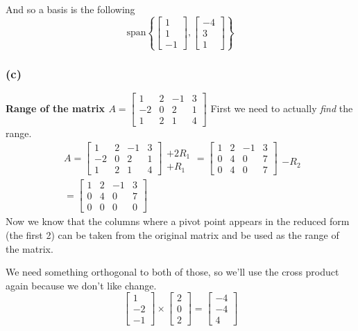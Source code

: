 \documentclass[10pt,letterpaper]{article}
\begin{document}
		And so a basis is the following
		$$
		\boxed{\text{span} \left\lbrace \begin{bmatrix}
		1 \\ 1 \\ -1
		\end{bmatrix}, \begin{bmatrix}
		-4 \\ 3 \\ 1
		\end{bmatrix} \right\rbrace}
		$$
	\subsubsection*{(c)} \textbf{Range of the matrix $A = \begin{bmatrix}
		1 & 2 & -1 & 3 \\ -2 & 0 & 2 & 1 \\ 1 & 2 & 1 & 4
		\end{bmatrix}$}
		First we need to actually \textit{find} the range.
		\begin{align*}
		& A = \begin{bmatrix}
		1 & 2 & -1 & 3 \\ -2 & 0 & 2 & 1 \\ 1 & 2 & 1 & 4
		\end{bmatrix} \begin{array}{c}
		\\ + 2 R_1 \\ + R_1
		\end{array} = \begin{bmatrix}
		1 & 2 & -1 & 3 \\ 0 & 4 & 0 & 7 \\ 0 & 4 & 0 & 7
		\end{bmatrix} \begin{array}{c}
		\\ \\ -R_2
		\end{array} \\ 
		& = \begin{bmatrix}
		1 & 2 & -1 & 3 \\ 0 & 4 & 0 & 7 \\ 0 & 0 & 0 & 0
		\end{bmatrix}
		\end{align*}
		Now we know that the columns where a pivot point appears in the reduced form (the first 2) can be taken from the original matrix and be used as the range of the matrix. 
		
		We need something orthogonal to both of those, so we'll use the cross product again because we don't like change. 
		$$
		\begin{bmatrix}
		1 \\-2 \\ -1
		\end{bmatrix} \times \begin{bmatrix}
		2 \\ 0 \\ 2
		\end{bmatrix} = \begin{bmatrix}
		-4 \\ -4 \\ 4
		\end{bmatrix}
		$$
		
\end{document}
